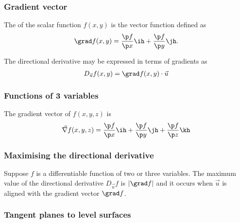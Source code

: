 \documentclass{article}
\begin{document}
\subsubsection{Gradient vector}

\begin{definition}
    The  of the scalar function $f(x,y)$ is the vector
    function defined as
    \begin{align*}
        \grad f(x,y)=\frac{\p f}{\p x}\ih + \frac{\p f}{\p y}\jh.
    \end{align*}
\end{definition}
\begin{theorem}
    The directional derivative may be expressed in terms of gradients
    as 
    \begin{align*}
        D_{\vec u}f(x,y)=\grad f(x,y)\cdot \vec u
    \end{align*}
\end{theorem}

\subsubsection{Functions of 3 variables}

\begin{definition}
    The gradient vector of $f(x,y,z)$ is
    \begin{align*}
        \vec\nabla f(x,y,z)=\frac{\p f}{\p x}\ih 
        + \frac{\p f}{\p y}\jh + \frac{\p f}{\p z}\kh
    \end{align*}
\end{definition}

\subsubsection{Maximising the directional derivative}

\begin{theorem}
    Suppose $f$ is a differentiable function of two or three variables.
    The maximum value of the directional derivative $D_{\vec u}f$ is
    $|\grad f|$ and it occurs when $\vec u$ is aligned with the gradient
    vector $\grad f$.
\end{theorem}

\subsubsection{Tangent planes to level surfaces}
\end{document}
